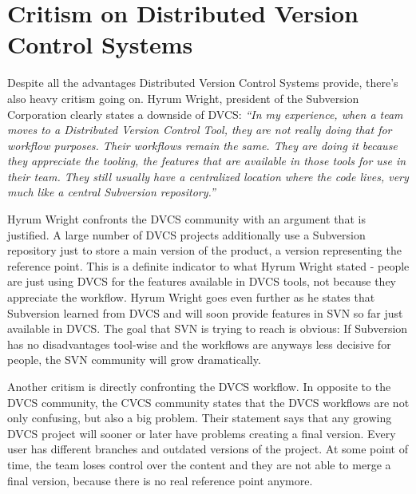 \section{Critism on Distributed Version Control Systems}\label{critismondvcs}

Despite all the advantages Distributed Version Control Systems provide, there's also heavy critism going on. Hyrum Wright, president of the Subversion Corporation clearly states a downside of DVCS: \textit{"`In my experience, when a team moves to a Distributed Version Control Tool, they are not really doing that for workflow purposes. Their workflows remain the same. They are doing it because they appreciate the tooling, the features that are available in those tools for use in their team. They still usually have a centralized location where the code lives, very much like a central Subversion repository."'} \cite{subversionandgit}\newline

Hyrum Wright confronts the DVCS community with an argument that is justified. A large number of DVCS projects additionally use a Subversion repository just to store a main version of the product, a version representing the reference point. This is a definite indicator to what Hyrum Wright stated - people are just using DVCS for the features available in DVCS tools, not because they appreciate the workflow. Hyrum Wright goes even further as he states that Subversion learned from DVCS and will soon provide features in SVN so far just available in DVCS. \cite{subversionandgit} The goal that SVN is trying to reach is obvious: If Subversion has no disadvantages tool-wise and the workflows are anyways less decisive for people, the SVN community will grow dramatically.

Another critism is directly confronting the DVCS workflow. In opposite to the DVCS community, the CVCS community states that the DVCS workflows are not only confusing, but also a big problem. Their statement says that any growing DVCS project will sooner or later have problems creating a final version. Every user has different branches and outdated versions of the project. At some point of time, the team loses control over the content and they are not able to merge a final version, because there is no real reference point anymore. 